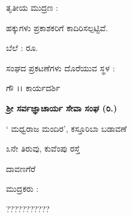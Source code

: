 \thispagestyle{empty}
{
\begin{center}

ತೃತೀಯ ಮುದ್ರಣ : 

\vfill

ಹಕ್ಕುಗಳು ಪ್ರಕಾಶಕರಿಗೆ ಕಾದಿರಿಸಲ್ಪಟ್ಟಿವೆ. 

\vfill

ಬೆಲೆ : ರೂ. 

\vfill

ಸಂಘದ ಪ್ರಕಟಣೆಗಳು ದೊರೆಯುವ ಸ್ಥಳ :

\medskip

ಗೌ ।। ಕಾರ್ಯದರ್ಶಿ

{\bf ಶ್ರೀ ಸರ್ವಜ್ಞಾಚಾರ್ಯ ಸೇವಾ ಸಂಘ (ರಿ.)}

` ಮಧ್ವರಾಜ ಮಂದಿರ', ಕಸ್ತೂರಿಬಾ ಬಡಾವಣೆ

೩ನೇ ತಿರುವು, ಕುವೆಂಪು ರಸ್ತೆ

ದಾವಣಗೆರೆ 

\vfill

ಮುದ್ರಕರು :

???????????

\end{center}

}
